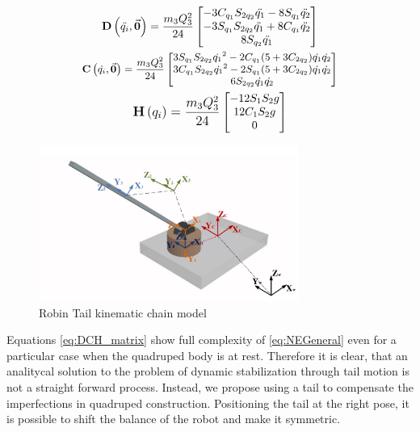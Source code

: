 \begin{gather}\label{eq:DCH_matrix}
\small
\mathbf{D}\left ( \ddot{q_i},\vec{\boldsymbol{0}} \right )=\frac{m_3 Q_3^2}{24}\begin{bmatrix}
-3C_{q_1}S_{2q_2}\ddot{q_1} -8S_{q_1}\ddot{q_2}\\ -3S_{q_1}S_{2q_2}\ddot{q_1} +8C_{q_1}\ddot{q_2} \\ 8S_{q_2}\ddot{q_1}
\end{bmatrix} \\
\footnotesize
\mathbf{C}\left ( \dot{q_i},\vec{\boldsymbol{0}} \right )=\frac{m_3 Q_3^2}{24} \begin{bmatrix}
3S_{q_1}S_{2q_2}{\dot{q_1}}^2-2C_{q_1}(5+3C_{2q_2})\dot{q_1}\dot{q_2}\\ 
3C_{q_1}S_{2q_2}{\dot{q_1}}^2-2S_{q_1}(5+3C_{2q_2})\dot{q_1}\dot{q_2}\\ 
6S_{2q_2}\dot{q_1}\dot{q_2}
\end{bmatrix}\\
\small
\mathbf{H}\left ( {q_i} \right )=\frac{m_3 Q_3^2}{24} \begin{bmatrix}
-12S_1S_2g\\ 
12C_1S_2g\\ 
0
\end{bmatrix}
\normalsize
\end{gather}

\begin{figure}
	\centering
	\includegraphics[width=85mm]{./pictures/RobinRepic.pdf}
	\caption{Robin Tail kinematic chain model}
	\label{fig:rmax}
\end{figure}

Equations \eqref{eq:DCH_matrix} show full complexity of \eqref{eq:NEGeneral} even for a particular case when the quadruped body is at rest. Therefore it is clear, that an analitycal solution to the problem of dynamic stabilization through tail motion is not a straight forward process. Instead, we propose using a tail to compensate the imperfections in quadruped construction. Positioning the tail at the right pose, it is possible to shift the balance of the robot and make it symmetric. 
